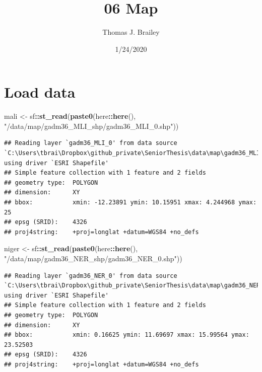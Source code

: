 \documentclass[
]{article}
\title{06 Map}
\author{Thomas J. Brailey}
\date{1/24/2020}
\newenvironment{Shaded}{\begin{snugshade}}{\end{snugshade}}
\newcommand{\KeywordTok}[1]{\textcolor[rgb]{0.13,0.29,0.53}{\textbf{#1}}}
\newcommand{\NormalTok}[1]{#1}
\newcommand{\OperatorTok}[1]{\textcolor[rgb]{0.81,0.36,0.00}{\textbf{#1}}}
\newcommand{\StringTok}[1]{\textcolor[rgb]{0.31,0.60,0.02}{#1}}
\begin{document}
\maketitle

{
\setcounter{tocdepth}{2}
\tableofcontents
}
\hypertarget{load-data}{%
\section{Load data}\label{load-data}}

\begin{Shaded}
\begin{Highlighting}[]
\NormalTok{mali <-}\StringTok{ }\NormalTok{sf}\OperatorTok{::}\KeywordTok{st_read}\NormalTok{(}\KeywordTok{paste0}\NormalTok{(here}\OperatorTok{::}\KeywordTok{here}\NormalTok{(), }\StringTok{"/data/map/gadm36_MLI_shp/gadm36_MLI_0.shp"}\NormalTok{))}
\end{Highlighting}
\end{Shaded}

\begin{verbatim}
## Reading layer `gadm36_MLI_0' from data source `C:\Users\tbrai\Dropbox\github_private\SeniorThesis\data\map\gadm36_MLI_shp\gadm36_MLI_0.shp' using driver `ESRI Shapefile'
## Simple feature collection with 1 feature and 2 fields
## geometry type:  POLYGON
## dimension:      XY
## bbox:           xmin: -12.23891 ymin: 10.15951 xmax: 4.244968 ymax: 25
## epsg (SRID):    4326
## proj4string:    +proj=longlat +datum=WGS84 +no_defs
\end{verbatim}

\begin{Shaded}
\begin{Highlighting}[]
\NormalTok{niger <-}\StringTok{ }\NormalTok{sf}\OperatorTok{::}\KeywordTok{st_read}\NormalTok{(}\KeywordTok{paste0}\NormalTok{(here}\OperatorTok{::}\KeywordTok{here}\NormalTok{(), }\StringTok{"/data/map/gadm36_NER_shp/gadm36_NER_0.shp"}\NormalTok{))}
\end{Highlighting}
\end{Shaded}

\begin{verbatim}
## Reading layer `gadm36_NER_0' from data source `C:\Users\tbrai\Dropbox\github_private\SeniorThesis\data\map\gadm36_NER_shp\gadm36_NER_0.shp' using driver `ESRI Shapefile'
## Simple feature collection with 1 feature and 2 fields
## geometry type:  POLYGON
## dimension:      XY
## bbox:           xmin: 0.16625 ymin: 11.69697 xmax: 15.99564 ymax: 23.52503
## epsg (SRID):    4326
## proj4string:    +proj=longlat +datum=WGS84 +no_defs
\end{verbatim}
\end{document}

